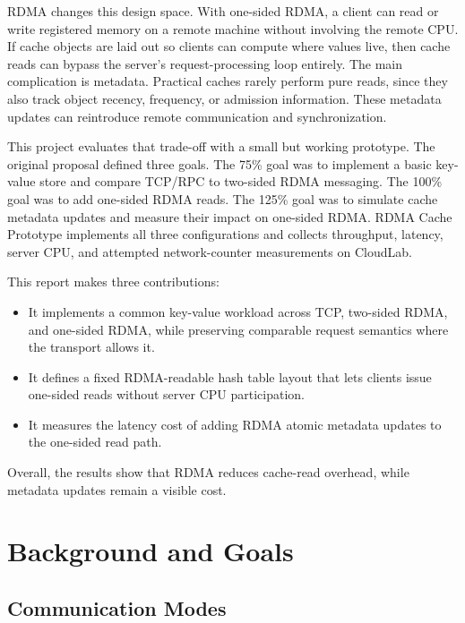 \documentclass[letterpaper,twocolumn,10pt]{article}
\newcommand{\sys}{RDMA Cache Prototype}
\begin{document}
RDMA changes this design space.  With one-sided RDMA, a client can read or
write registered memory on a remote machine without involving the remote CPU.
If cache objects are laid out so clients can compute where values live, then
cache reads can bypass the server's request-processing loop entirely.  The
main complication is metadata. Practical caches rarely perform pure reads, since
they also track object recency, frequency, or admission information.  These
metadata updates can reintroduce remote communication and synchronization.

This project evaluates that trade-off with a small but working prototype.
The original proposal defined three goals.  The 75\% goal was to implement a
basic key-value store and compare TCP/RPC to two-sided RDMA messaging.  The
100\% goal was to add one-sided RDMA reads.  The 125\% goal was to simulate
cache metadata updates and measure their impact on one-sided RDMA.  \sys{}
implements all three configurations and collects throughput, latency, server
CPU, and attempted network-counter measurements on CloudLab.

This report makes three contributions:
\begin{itemize}[leftmargin=*,noitemsep]
\item It implements a common key-value workload across TCP, two-sided RDMA,
and one-sided RDMA, while preserving comparable request semantics where the
transport allows it.
\item It defines a fixed RDMA-readable hash table layout that lets clients
issue one-sided reads without server CPU participation.
\item It measures the latency cost of adding RDMA atomic metadata updates to
the one-sided read path.
\end{itemize}

Overall, the results show that RDMA reduces cache-read overhead, while metadata updates remain a visible cost.


\section{Background and Goals}

\subsection{Communication Modes}
\end{document}
